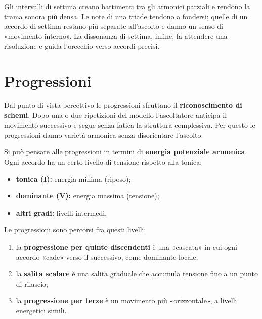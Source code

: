 \begin{fisica}
	\label{phys:settime_colore}
	Gli intervalli di settima creano battimenti tra gli armonici parziali e rendono la trama sonora più densa. Le note di una triade tendono a fondersi; quelle di un accordo di settima restano più separate all'ascolto e danno un senso di «movimento interno». La dissonanza di settima, infine, fa attendere una risoluzione e guida l'orecchio verso accordi precisi.
\end{fisica}

\section*{Progressioni}

\begin{fisica}
	\label{phys:perche_progressioni}
	Dal punto di vista percettivo le progressioni sfruttano il \textbf{riconoscimento di schemi}. Dopo una o due ripetizioni del modello l'ascoltatore anticipa il movimento successivo e segue senza fatica la struttura complessiva. Per questo le progressioni danno varietà armonica senza disorientare l'ascolto.
\end{fisica}

\begin{fisica}
	\label{phys:energia_armonica}
	Si può pensare alle progressioni in termini di \textbf{energia potenziale armonica}. Ogni accordo ha un certo livello di tensione rispetto alla tonica:
	\begin{itemize}
		\item \textbf{tonica (I):} energia minima (riposo);
		\item \textbf{dominante (V):} energia massima (tensione);
		\item \textbf{altri gradi:} livelli intermedi.
	\end{itemize}
	Le progressioni sono percorsi fra questi livelli:
	\begin{enumerate}
		\item la \textbf{progressione per quinte discendenti} è una «cascata» in cui ogni accordo «cade» verso il successivo, come dominante locale;
		\item la \textbf{salita scalare} è una salita graduale che accumula tensione fino a un punto di rilascio;
		\item la \textbf{progressione per terze} è un movimento più «orizzontale», a livelli energetici simili.
	\end{enumerate}
\end{fisica}

